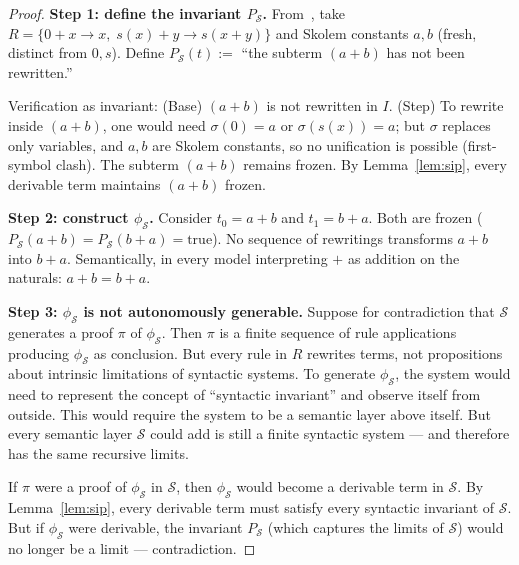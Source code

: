 \documentclass[11pt]{article}
\begin{document}
\begin{proof}
\textbf{Step 1: define the invariant $P_{\mathcal{S}}$.}
From~\cite{buono2026sip}, take $R = \{0 + x \to x,\; s(x) + y \to
s(x+y)\}$ and Skolem constants $a, b$ (fresh, distinct from $0, s$).
Define $P_{\mathcal{S}}(t) :=$ ``the subterm $(a+b)$ has not been
rewritten.''

Verification as invariant: (Base) $(a+b)$ is not rewritten in $I$.
(Step) To rewrite inside $(a+b)$, one would need $\sigma(0) = a$ or
$\sigma(s(x)) = a$; but $\sigma$ replaces only variables, and $a, b$ are
Skolem constants, so no unification is possible (first-symbol clash). The
subterm $(a+b)$ remains frozen. By Lemma~\ref{lem:sip}, every derivable
term maintains $(a+b)$ frozen.

\textbf{Step 2: construct $\phi_{\mathcal{S}}$.}
Consider $t_0 = a+b$ and $t_1 = b+a$. Both are frozen
($P_{\mathcal{S}}(a+b) = P_{\mathcal{S}}(b+a) = \mathrm{true}$). No
sequence of rewritings transforms $a+b$ into $b+a$. Semantically, in
every model interpreting $+$ as addition on the naturals:
$a + b = b + a$.

\textbf{Step 3: $\phi_{\mathcal{S}}$ is not autonomously generable.}
Suppose for contradiction that $\mathcal{S}$ generates a proof $\pi$ of
$\phi_{\mathcal{S}}$. Then $\pi$ is a finite sequence of rule
applications producing $\phi_{\mathcal{S}}$ as conclusion. But every
rule in $R$ rewrites terms, not propositions about intrinsic limitations
of syntactic systems. To generate $\phi_{\mathcal{S}}$, the system would
need to represent the concept of ``syntactic invariant'' and observe
itself from outside. This would require the system to be a semantic layer
above itself. But every semantic layer $\mathcal{S}$ could add is still a
finite syntactic system --- and therefore has the same recursive limits.

If $\pi$ were a proof of $\phi_{\mathcal{S}}$ in $\mathcal{S}$, then
$\phi_{\mathcal{S}}$ would become a derivable term in $\mathcal{S}$.
By Lemma~\ref{lem:sip}, every derivable term must satisfy every
syntactic invariant of $\mathcal{S}$. But if $\phi_{\mathcal{S}}$ were
derivable, the invariant $P_{\mathcal{S}}$ (which captures the limits of
$\mathcal{S}$) would no longer be a limit --- contradiction.
\end{proof}
\end{document}
